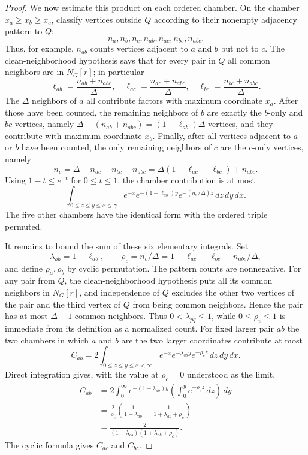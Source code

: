 \begin{proof}
We now estimate this product on each ordered chamber.  On the chamber
$x_a\ge x_b\ge x_c$, classify vertices outside $Q$ according to their
nonempty adjacency pattern to $Q$:
\[
n_a,n_b,n_c,n_{ab},n_{ac},n_{bc},n_{abc}.
\]
Thus, for example, $n_{ab}$ counts vertices adjacent to $a$ and $b$ but not
to $c$.  The clean-neighborhood hypothesis says that for every pair in $Q$
all common neighbors are in $N_G[r]$; in particular
\[
\ell_{ab}=\frac{n_{ab}+n_{abc}}{\Delta},\quad
\ell_{ac}=\frac{n_{ac}+n_{abc}}{\Delta},\quad
\ell_{bc}=\frac{n_{bc}+n_{abc}}{\Delta}.
\]
The $\Delta$ neighbors of $a$ all contribute factors with maximum coordinate
$x_a$.  After those have been counted, the remaining neighbors of $b$ are
exactly the $b$-only and $bc$-vertices, namely
$\Delta-(n_{ab}+n_{abc})=(1-\ell_{ab})\Delta$ vertices, and they contribute
with maximum coordinate $x_b$.  Finally, after all vertices adjacent to
$a$ or $b$ have been counted, the only remaining neighbors of $c$ are the
$c$-only vertices, namely
\[
n_c=\Delta-n_{ac}-n_{bc}-n_{abc}
=\Delta(1-\ell_{ac}-\ell_{bc})+n_{abc}.
\]
Using $1-t\le e^{-t}$ for $0\le t\le1$, the chamber contribution is at most
\[
\int_{0\le z\le y\le x\le\gamma}
e^{-x}e^{-(1-\ell_{ab})y}e^{-(n_c/\Delta)z}\,dz\,dy\,dx .
\]
The five other chambers have the identical form with the ordered triple
permuted.

It remains to bound the sum of these six elementary integrals.  Set
\[
\lambda_{ab}=1-\ell_{ab},\qquad
\rho_c=n_c/\Delta
=1-\ell_{ac}-\ell_{bc}+n_{abc}/\Delta,
\]
and define $\rho_a,\rho_b$ by cyclic permutation.  The pattern counts are
nonnegative.  For any pair from $Q$, the clean-neighborhood hypothesis puts
all its common neighbors in $N_G[r]$, and independence of $Q$ excludes the
other two vertices of the pair and the third vertex of $Q$ from being common
neighbors.  Hence the pair has at most $\Delta-1$ common neighbors.  Thus
$0<\lambda_{pq}\le1$, while
$0\le\rho_v\le1$ is immediate from its definition as a normalized count.
For fixed larger pair $ab$ the two chambers in which $a$ and $b$ are the two
larger coordinates contribute at most
\[
C_{ab}
=2\int_{0\le z\le y\le x<\infty}
e^{-x}e^{-\lambda_{ab}y}e^{-\rho_c z}\,dz\,dy\,dx .
\]
Direct integration gives, with the value at $\rho_c=0$ understood as the
limit,
\[
\begin{aligned}
C_{ab}
&=2\int_0^\infty e^{-(1+\lambda_{ab})y}
  \left(\int_0^y e^{-\rho_c z}\,dz\right)\,dy  \\
&=\frac{2}{\rho_c}
  \left(\frac1{1+\lambda_{ab}}
  -\frac1{1+\lambda_{ab}+\rho_c}\right)  \\
&=\frac{2}{(1+\lambda_{ab})(1+\lambda_{ab}+\rho_c)}.
\end{aligned}
\]
The cyclic formula gives $C_{ac}$ and $C_{bc}$.


\end{proof}
